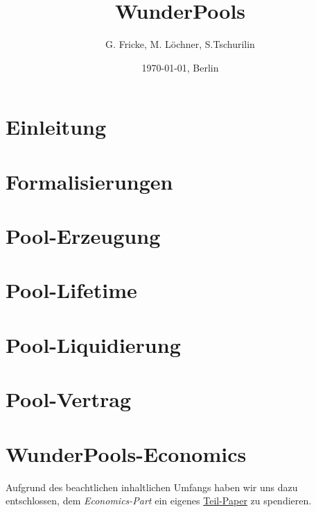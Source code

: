 \documentclass[11pt]{scrartcl}
\title{WunderPools}
\author{G. Fricke, M. Löchner, S.Tschurilin}
\date{\today{}, Berlin}
\begin{document}
\maketitle
\tableofcontents{}

\newpage



\section{Einleitung}
\label{sec:pools-einleitung}
\vspace{0.3cm}


\section{Formalisierungen}
\vspace{0.3cm}


\section{Pool-Erzeugung}
\vspace{0.3cm}


\section{Pool-Lifetime}
\vspace{0.3cm}


\section{Pool-Liquidierung}
\label{sec:pools-liquidierung}
\vspace{0.3cm}


\section{Pool-Vertrag}
\label{sec:pools-vertrag}
\vspace{0.3cm}


\section{WunderPools-Economics}
\vspace{0.3cm}

Aufgrund des beachtlichen inhaltlichen Umfangs haben wir uns dazu entschlossen, dem \textit{Economics-Part} ein eigenes \href{https://github.com/WunderPass/White-Paper/blob/main/pools-economics.pdf}{Teil-Paper} zu spendieren.
\end{document}
